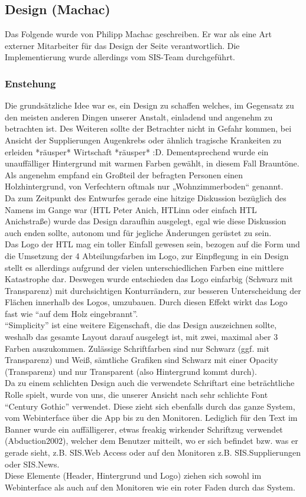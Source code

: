\subsection{Design (Machac)}
Das Folgende wurde von Philipp Machac geschreiben. Er war als eine Art externer Mitarbeiter für das Design der Seite verantwortlich. Die Implementierung wurde allerdings vom SIS-Team durchgeführt.
\subsubsection{Enstehung}
Die grundsätzliche Idee war es, ein Design zu schaffen welches, im Gegensatz zu den meisten anderen Dingen unserer Anstalt, einladend und angenehm zu betrachten ist. Des Weiteren sollte der Betrachter nicht in Gefahr kommen, bei Ansicht der Supplierungen Augenkrebs oder ähnlich tragische Krankeiten zu erleiden *räusper* Wirtschaft *räusper* :D. Dementsprechend wurde ein unauffälliger Hintergrund mit warmen Farben gewählt, in diesem Fall Brauntöne. Als angenehm empfand ein Großteil der befragten Personen einen Holzhintergrund, von Verfechtern oftmals nur „Wohnzimmerboden“ genannt.\\
Da zum Zeitpunkt des Entwurfes gerade eine hitzige Diskussion bezüglich des Namens im Gange war (HTL Peter Anich, HTLinn oder einfach HTL Anichstraße) wurde das Design daraufhin ausgelegt, egal wie diese Diskussion auch enden sollte, autonom und für jegliche Änderungen gerüstet zu sein.\\
Das Logo der HTL mag ein toller Einfall gewesen sein, bezogen auf die Form und die Umsetzung der 4 Abteilungsfarben im Logo, zur Einpflegung in ein Design stellt es allerdings aufgrund der vielen unterschiedlichen Farben eine mittlere Katastrophe dar. Deswegen wurde entschieden das Logo einfarbig (Schwarz mit Transparenz) mit durchsichtigen Konturrändern, zur besseren Unterscheidung der Flächen innerhalb des Logos, umzubauen. Durch diesen Effekt wirkt das Logo fast wie \enquote{auf dem Holz eingebrannt}.\\
\enquote{Simplicity} ist eine weitere Eigenschaft, die das Design auszeichnen sollte, weshalb das gesamte Layout darauf ausgelegt ist, mit zwei, maximal aber 3 Farben auszukommen. Zulässige Schriftfarben sind nur Schwarz (ggf. mit Transparenz) und Weiß, sämtliche Grafiken sind Schwarz mit einer Opacity (Transparenz) und nur Transparent (also Hintergrund kommt durch).\\
Da zu  einem schlichten Design auch die verwendete Schriftart eine beträchtliche Rolle spielt, wurde von uns, die unserer Ansicht nach sehr schlichte Font \enquote{Century Gothic} verwendet. Diese zieht sich ebenfalls durch das ganze System, vom Webinterface über die App bis zu den Monitoren. Lediglich für den Text im Banner wurde ein auffälligerer, etwas freakig wirkender Schriftzug verwendet (Abduction2002), welcher dem Benutzer mitteilt, wo er sich befindet bzw. was er gerade sieht, z.B. SIS.Web Access oder auf den Monitoren z.B. SIS.Supplierungen oder SIS.News.\\
Diese Elemente (Header, Hintergrund und Logo) ziehen sich sowohl im Webinterface als auch auf den Monitoren wie ein roter Faden durch das System.\\
